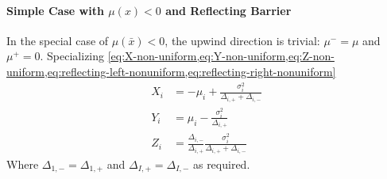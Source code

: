 \documentclass[11pt]{etk-article}
\begin{document}
\paragraph{Simple Case with $\mu(x) < 0$ and Reflecting Barrier}
In the special case of $\mu(\bar{x}) < 0$, the upwind direction is trivial: $\mu^{-} = \mu$ and $\mu^{+} = 0$.  Specializing \cref{eq:X-non-uniform,eq:Y-non-uniform,eq:Z-non-uniform,eq:reflecting-left-nonuniform,eq:reflecting-right-nonuniform}
\begin{align}
	X_i &= - \mu_i+ \frac{\sigma_i^{2}}{\Delta_{i,+}+\Delta_{i,-}}\label{eq:X-non-uniform-backwards} \\
	Y_i &= \mu_i - \frac{\sigma_i^{2}}{\Delta_{i,+}}\label{eq:Y-non-uniform-backwards} \\
	Z_i &= \frac{\Delta_{i,-}}{\Delta_{i,+}}\frac{\sigma_i^{2}}{\Delta_{i,+}+\Delta_{i,-}}\label{eq:Z-non-uniform-backwards}
\end{align}
Where $\Delta_{1,-} = \Delta_{1,+}$ and $\Delta_{I,+} = \Delta_{I,-}$ as required.
\end{document}
